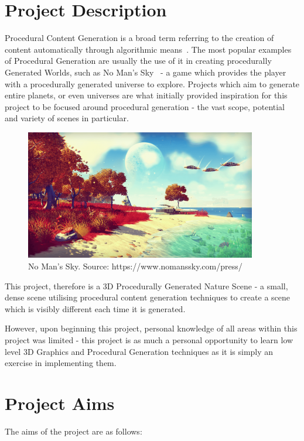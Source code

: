 \documentclass[a4paper,10pt]{report}
\begin{document}
\section{Project Description}

Procedural Content Generation is a broad term referring to the creation of content automatically through algorithmic means~\cite{yannakakis2011experience}. The most popular examples of Procedural Generation are usually the use of it in creating procedurally Generated Worlds, such as No Man's Sky~\cite{nomanssky} - a game which provides the player with a procedurally generated universe to explore. Projects which aim to generate entire planets, or even universes are what initially provided inspiration for this project to be focused around procedural generation - the vast scope, potential and variety of scenes in particular. \medskip


\begin{figure}[h!]
    \centering
  \includegraphics[width=0.9\textwidth]{NoMansSky}
 \caption{No Man's Sky. Source: https://www.nomanssky.com/press/}
 \label{fig:no_mans_sky}
\end{figure}


This project, therefore is a 3D Procedurally Generated Nature Scene - a small, dense scene utilising procedural content generation techniques to create a  scene which is visibly different each time it is generated. \medskip

However, upon beginning this project, personal knowledge of all areas within this project was limited - this project is as much a personal opportunity to learn low level 3D Graphics and Procedural Generation techniques as it is simply an exercise in implementing them. 

\section{Project Aims}
The aims of the project are as follows:\medskip
\end{document}
